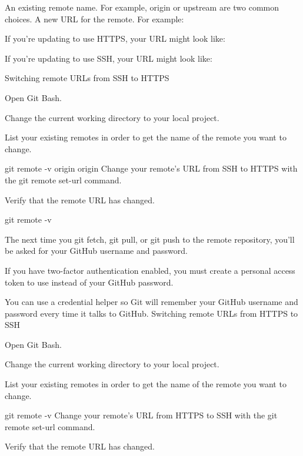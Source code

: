 \documentclass{article}\usepackage[]{graphicx}\usepackage[]{color}
\begin{document}
An existing remote name. For example, origin or upstream are two common choices.
A new URL for the remote. For example:

If you're updating to use HTTPS, your URL might look like:

If you're updating to use SSH, your URL might look like:

Switching remote URLs from SSH to HTTPS

Open Git Bash.

Change the current working directory to your local project.

List your existing remotes in order to get the name of the remote you want to change.

git remote -v
origin  %
origin  %
Change your remote's URL from SSH to HTTPS with the git remote set-url command.

Verify that the remote URL has changed.

git remote -v

The next time you git fetch, git pull, or git push to the remote repository, you'll be asked for your GitHub username and password.

If you have two-factor authentication enabled, you must create a personal access token to use instead of your GitHub password.

You can use a credential helper so Git will remember your GitHub username and password every time it talks to GitHub.
Switching remote URLs from HTTPS to SSH

Open Git Bash.

Change the current working directory to your local project.

List your existing remotes in order to get the name of the remote you want to change.

git remote -v
Change your remote's URL from HTTPS to SSH with the git remote set-url command.

Verify that the remote URL has changed.
\end{document}
